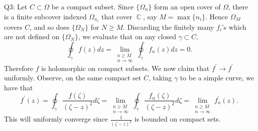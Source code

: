 \documentclass[letterpaper]{article}
\DeclareMathOperator{\C}{\mathbb{C}}
\begin{document}
 \noindent  Q3: Let $C \subset \Omega$ be a compact subset. Since $\{\Omega_n\}$ form
an open cover of $\Omega$, there is a finite subcover indexed $\Omega_{n_i}$ that cover $\C$, say $M = \max\{n_i\}$. Hence $\Omega_M$ covers
$C$, and so does $\{\Omega_{N}\}$ for $N \geq M$. Discarding the finitely many $f_i$'s which are 
not defined on $\{\Omega_N\}$, we evaluate that on any closed $\gamma \subset C$, $$\oint_{\gamma} f(z)dz = \lim_{\substack{n\geq M \\ n\to \infty}}\oint_\gamma f_n(z)dz = 0.$$
Therefore $f$ is holomorphic on compact subsets. We now claim that $f^\prime \to f^\prime$ uniformly. Observe, on the same compact set $C$, taking $\gamma$ to be a simple curve, we have that
$$f^\prime(z) = \oint_{\gamma} \frac{f(\zeta)}{(\zeta - z)^2}d\zeta = \lim_{\substack{n\geq M \\ n\to \infty}} \oint_{\gamma}\frac{f_n(\zeta)}{(\zeta - z)^2}d\zeta = \lim_{\substack{n\geq M \\ n\to \infty}} f_n^\prime(z).$$
This will uniformly converge since $\frac{1}{(\zeta -z)^2}$ is bounded on compact sets. 
\end{document}
